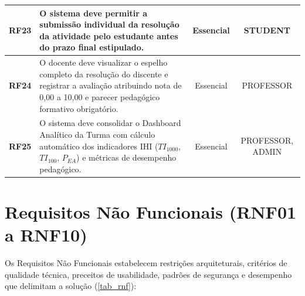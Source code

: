 \begin{table}[htb]
\begin{tabularx}{\textwidth}{l X c c}
\midrule
\textbf{RF23} & O sistema deve permitir a submissão individual da resolução da atividade pelo estudante antes do prazo final estipulado. & Essencial & STUDENT \\
\midrule
\textbf{RF24} & O docente deve visualizar o espelho completo da resolução do discente e registrar a avaliação atribuindo nota de 0,00 a 10,00 e parecer pedagógico formativo obrigatório. & Essencial & PROFESSOR \\
\midrule
\textbf{RF25} & O sistema deve consolidar o Dashboard Analítico da Turma com cálculo automático dos indicadores IHI ($TI_{1000}$, $TI_{100}$, $P_{EA}$) e métricas de desempenho pedagógico. & Essencial & PROFESSOR, ADMIN \\
\bottomrule
\end{tabularx}
\end{table}

\section{Requisitos Não Funcionais (RNF01 a RNF10)}
\label{sec_requisitos_nao_funcionais}

Os Requisitos Não Funcionais estabelecem restrições arquiteturais, critérios de qualidade técnica, preceitos de usabilidade, padrões de segurança e desempenho que delimitam a solução (\autoref{tab_rnf}):

